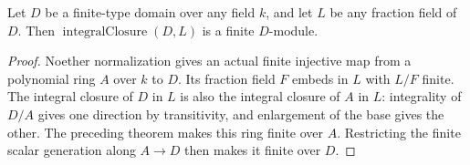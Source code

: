 \begin{theorem}
\label{thm:normalization-finite-arbitrary-field}
\leanok
Let $D$ be a finite-type domain over any field $k$, and let $L$ be any
fraction field of $D$. Then $\operatorname{integralClosure}(D,L)$
is a finite $D$-module.
\end{theorem}
\begin{proof}
Noether normalization gives an actual finite injective map from a
polynomial ring $A$ over $k$ to $D$. Its fraction field $F$ embeds
in $L$ with $L/F$ finite. The integral closure of $D$ in $L$ is also
the integral closure of $A$ in $L$: integrality of $D/A$ gives one
direction by transitivity, and enlargement of the base gives the
other. The preceding theorem makes this ring finite over $A$.
Restricting the finite scalar generation along $A\to D$ then makes
it finite over $D$.
\end{proof}

\endgroup

